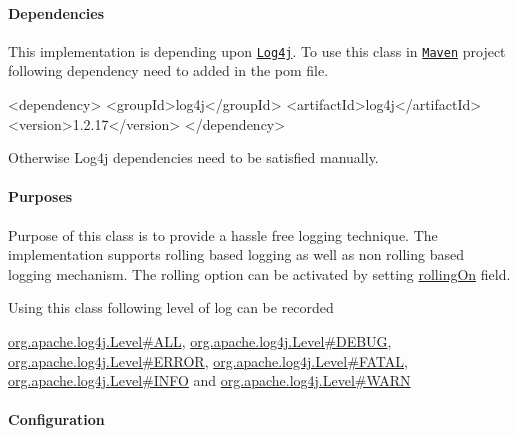 \paragraph*{Dependencies}

This implementation is depending upon \href{https://logging.apache.org/log4j/}{\tt Log4j}. To use this class in \href{https://maven.apache.org/}{\tt Maven} project following dependency need to added in the pom file. 
\begin{DoxyPre}

\begin{DoxyCode}
<dependency>
<groupId>log4j</groupId>
<artifactId>log4j</artifactId>
<version>1.2.17</version>
</dependency>
\end{DoxyCode}
 
 \end{DoxyPre}
 Otherwise Log4j dependencies need to be satisfied manually. \paragraph*{Purposes}

Purpose of this class is to provide a hassle free logging technique. The implementation supports rolling based logging as well as non rolling based logging mechanism. The rolling option can be activated by setting \mbox{\hyperlink{}{rolling\+On}} field.

Using this class following level of log can be recorded 
\begin{DoxyPre}
 \mbox{\hyperlink{}{org.apache.log4j.Level#ALL}}, \mbox{\hyperlink{}{org.apache.log4j.Level#DEBUG}},
 \mbox{\hyperlink{}{org.apache.log4j.Level#ERROR}}, \mbox{\hyperlink{}{org.apache.log4j.Level#FATAL}},
 \mbox{\hyperlink{}{org.apache.log4j.Level#INFO}} and \mbox{\hyperlink{}{org.apache.log4j.Level#WARN}}
 \end{DoxyPre}


\paragraph*{Configuration}

